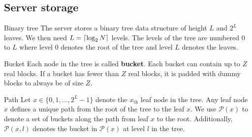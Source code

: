 	\subsection{Server storage}

		\begin{frame}{\subsecname}
			
			\begin{block}{Binary tree}
				The server stores a binary tree data structure of height $L$ and $2^L$ leaves.
				We then need $L = \ceil*{ \log_2 N }$ levels. 
				The levels of the tree are numbered $0$ to $L$ where level $0$ denotes the root of the tree and level $L$ denotes the leaves.
			\end{block}

		\end{frame}

		\begin{frame}{\subsecname}
			
			\begin{block}{Bucket}
				Each node in the tree is called \textbf{bucket}. 
				Each bucket can contain up to $Z$ real blocks. 
				If a bucket has fewer than $Z$ real blocks, it is padded with dummy blocks to always be of size $Z$.
			\end{block}

		\end{frame}

		\begin{frame}{\subsecname}
			
			\begin{block}{Path}
				Let $x \in \{ 0, 1, \ldots, 2^L - 1 \}$ denote the $x_{\text{th}}$ leaf node in the tree. 
				Any leaf node $x$ defines a unique path from the root of the tree to the leaf $x$.
				We use $\mathcal{P}(x)$ to denote a set of buckets along the path from leaf $x$ to the root. 
				Additionally, $\mathcal{P}(x,l)$ denotes the bucket in $\mathcal{P}(x)$ at level $l$ in the tree.
			\end{block}

		\end{frame}

